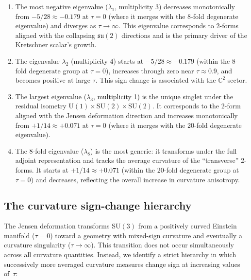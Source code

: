 \documentclass[12pt]{article}
\theoremstyle{definition}
\theoremstyle{remark}
\begin{document}
\begin{enumerate}
    \item The most negative eigenvalue ($\lambda_1$, multiplicity 3) decreases monotonically from $-5/28\approx-0.179$ at $\tau=0$ (where it merges with the 8-fold degenerate eigenvalue) and diverges as $\tau\to\infty$.  This eigenvalue corresponds to 2-forms aligned with the collapsing $\mathfrak{su}(2)$ directions and is the primary driver of the Kretschner scalar's growth.

    \item The eigenvalue $\lambda_2$ (multiplicity 4) starts at $-5/28\approx-0.179$ (within the 8-fold degenerate group at $\tau=0$), increases through zero near $\tau\approx0.9$, and becomes positive at large $\tau$.  This sign change is associated with the $\mathbb{C}^2$ sector.

    \item The largest eigenvalue ($\lambda_3$, multiplicity 1) is the unique singlet under the residual isometry $\mathrm{U}(1)\times\mathrm{SU}(2)\times\mathrm{SU}(2)$.  It corresponds to the 2-form aligned with the Jensen deformation direction and increases monotonically from $+1/14\approx+0.071$ at $\tau=0$ (where it merges with the 20-fold degenerate eigenvalue).

    \item The 8-fold eigenvalue ($\lambda_8$) is the most generic: it transforms under the full adjoint representation and tracks the average curvature of the ``transverse'' 2-forms.  It starts at $+1/14\approx+0.071$ (within the 20-fold degenerate group at $\tau=0$) and decreases, reflecting the overall increase in curvature anisotropy.
\end{enumerate}

\subsection{The curvature sign-change hierarchy}
\label{subsec:hierarchy}

The Jensen deformation transforms $\mathrm{SU}(3)$ from a positively curved Einstein manifold ($\tau=0$) toward a geometry with mixed-sign curvature and eventually a curvature singularity ($\tau\to\infty$).  This transition does not occur simultaneously across all curvature quantities.  Instead, we identify a strict hierarchy in which successively more averaged curvature measures change sign at increasing values of~$\tau$:
\end{document}
